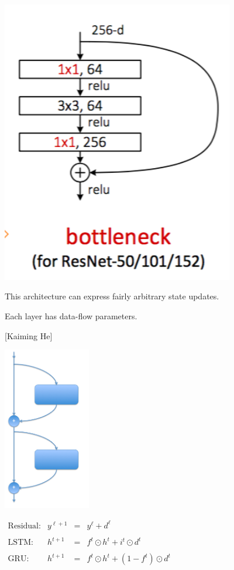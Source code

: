 {\includegraphics[width= 4.0in]{../images/bottleneck}
\hfill \begin{minipage}[b]{4in} This architecture can express fairly arbitrary state updates.

  \bigskip
  \bigskip
  Each layer has data-flow parameters.
  ~
  \vspace{8ex}
  ~
\end{minipage}

{\large \hspace{4em} [Kaiming He]}


\includegraphics[width= 1.5in]{../images/resnet}
\hfill \begin{minipage}[b]{6in}
  $\begin{array}{lrcl}
    \mbox{Residual:} & y^{\ell+1} & = & y^\ell + d^\ell \\
    \\
    \mbox{LSTM:} & h^{t+1} & = & f^t \odot h^t + i^t \odot d^t \\
    \\
   \mbox{GRU:}\; &  h^{t+1} & = & f^t \odot h^t + (1-f^t)\odot d^t \\
  \end{array}$
  

\end{minipage}}
